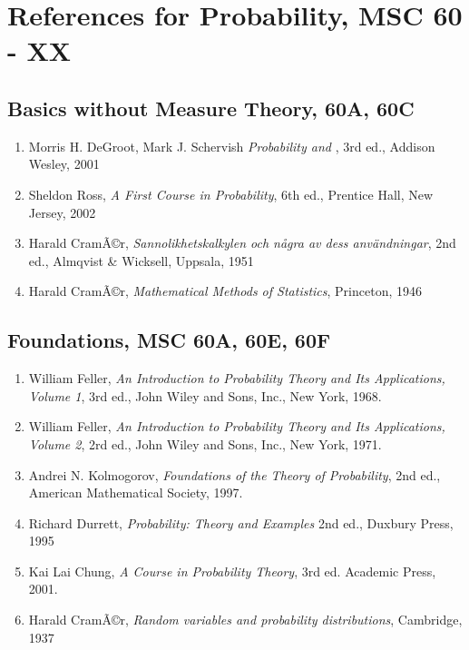 \documentclass[12pt]{article}
\begin{document}
\section*{References for Probability, MSC 60 - XX}

\subsection*{Basics without Measure Theory, 60A, 60C}
\begin{enumerate}
\item Morris H. DeGroot, Mark J. Schervish \emph{Probability and }, 3rd ed., Addison Wesley, 2001
\item Sheldon Ross, \emph{A First Course in Probability}, 6th ed., Prentice Hall, New Jersey, 2002
\item Harald CramÃ©r, {\em Sannolikhetskalkylen och n\aa{}gra av dess anv\"andningar}, 2nd ed., Almqvist \& Wicksell, Uppsala, 1951
\item Harald CramÃ©r, {\em Mathematical Methods of Statistics}, Princeton, 1946
\end{enumerate}

\subsection*{Foundations, MSC 60A, 60E, 60F}
\begin{enumerate}
\item William Feller, \emph{An Introduction to Probability Theory and Its Applications,
Volume 1}, 3rd ed., John Wiley and Sons, Inc., New York, 1968.
\item William Feller, \emph{An Introduction to Probability Theory and Its Applications,
Volume 2}, 2rd ed., John Wiley and Sons, Inc., New York, 1971.
\item Andrei N. Kolmogorov, \emph{Foundations of the Theory of Probability},
2nd ed., American Mathematical Society, 1997.
\item Richard Durrett, \emph{Probability: Theory and Examples} 2nd
ed., Duxbury Press, 1995
\item Kai Lai Chung, \emph{A Course in Probability Theory}, 3rd ed. Academic Press, 2001.
\item Harald CramÃ©r, {\em Random variables and probability distributions}, Cambridge, 1937
\end{enumerate}
\end{document}
